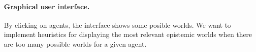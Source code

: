 \documentclass{article}
\begin{document}
\paragraph{Graphical user interface. }  By clicking on agents, the interface shows some posible worlds. We want to implement heuristics for displaying the most relevant epistemic worlds when there are too many possible worlds for a given agent.






\newpage





\end{document}

